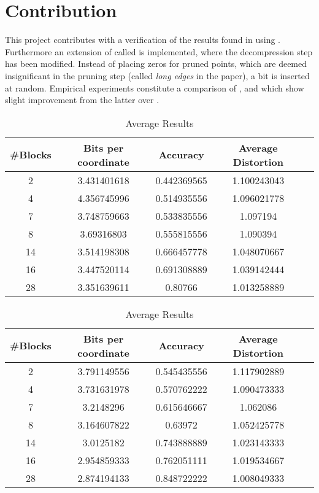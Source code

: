\section{Contribution}
\label{contribution}
This project contributes with a verification of the results found in \cite{wagner17} using \qs{}. Furthermore an extension of \qs{} called \qsr{} is implemented, where the decompression step has been modified. Instead of placing zeros for pruned points, which are deemed insignificant in the pruning step (called \textit{long edges} in the paper), a bit is inserted at random. Empirical experiments constitute a comparison of \qs{}, \grid{} and \qsr{} which show slight improvement from the latter over \qs{}.

\begin{table}[h!]
	\centering
	\caption{Average Results \mnist{} \qs{}}
	\label{table:avg_mnist_qs}
	\begin{tabular}{ccccc}
		\hline
		\#Blocks & Bits per coordinate & Accuracy  & Average Distortion \\ \hline
		2 & 3.431401618 & 0.442369565 & 1.100243043  \\
		4 & 4.356745996 & 0.514935556 & 1.096021778  \\
		7 & 3.748759663 & 0.533835556 & 1.097194 \\
		8 & 3.69316803 & 0.555815556 & 1.090394 \\
		14 & 3.514198308 & 0.666457778 & 1.048070667 \\
		16 & 3.447520114 & 0.691308889 & 1.039142444 \\
		28 & 3.351639611 & 0.80766 & 1.013258889 \\
		\hline
	\end{tabular}
\end{table}

\begin{table}[h!]
	\centering
	\caption{Average Results \mnist{} \qsr{}}
	\label{table:avg_mnist_qsr}
	\begin{tabular}{ccccc}
		\hline
		\#Blocks & Bits per coordinate & Accuracy  & Average Distortion \\ \hline
		2 & 3.791149556 & 0.545435556 & 1.117902889  \\
		4 & 3.731631978 & 0.570762222 & 1.090473333  \\
		7 & 3.2148296 & 0.615646667 & 1.062086 \\
		8 & 3.164607822 & 0.63972 & 1.052425778 \\
		14 & 3.0125182 & 0.743888889 & 1.023143333 \\
		16 & 2.954859333 & 0.762051111 & 1.019534667 \\
		28 & 2.874194133 & 0.848722222 & 1.008049333 \\
		\hline
	\end{tabular}
\end{table}

